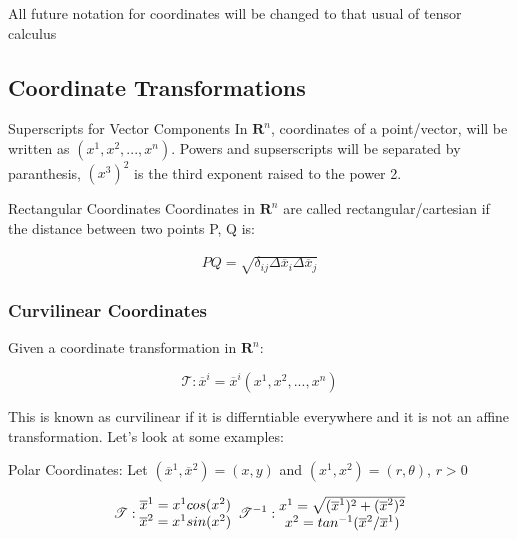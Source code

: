 \documentclass{article}
\begin{document}
All future notation for coordinates will be changed to that usual of tensor calculus

\subsection{Coordinate Transformations}

\noindent
Superscripts for Vector Components
In $\mathbf{ R }^n$, coordinates of a point/vector, will be written as $(x^1, x^2,..., x^n)$.  Powers and supserscripts will be separated by paranthesis, $(x^3)^2$ is the third exponent raised to the power 2.

\noindent
Rectangular Coordinates
Coordinates in $\mathbf{ R }^n$ are called rectangular/cartesian if the distance between two points P, Q is:

\begin{align*}
	PQ = \sqrt{ \delta_{ij} \Delta \overline{ x }_i \Delta \overline{ x }_j }
\end{align*}

\subsubsection{Curvilinear Coordinates}
Given a coordinate transformation in $\mathbf{ R }^n$:

\begin{equation}
	\mathscr{ T } : \overline{ x }^i = \overline{ x }^i ( x^1, x^2, ..., x^n )
\end{equation}

\noindent
This is known as curvilinear if it is differntiable everywhere and it is not an affine transformation.  Let's look at some examples:


Polar Coordinates: Let $( \overline{ x }^1, \overline{ x }^2 ) = ( x, y )$ and $( x^1, x^2 ) = ( r, \theta )$, $r > 0$

\begin{equation}
	\mathscr{ T } :
	\begin{matrix}
	\overline{ x }^1 = x^1 cos( x^2 )\\
	\overline{ x }^2 = x^1 sin( x^2 )
	\end{matrix}\\
	\mathscr{ T }^{-1} :
	\begin{matrix}
	x^1 = \sqrt{ ( \overline{ x }^1 )^2 + ( \overline{ x }^2 )^2 }\\
	x^2 = tan^{-1}( \overline{ x }^2 / \overline{ x }^1 )
	\end{matrix}
\end{equation}
\end{document}
